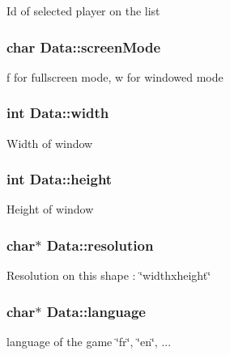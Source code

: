 Id of selected player on the list 
\subsubsection{\setlength{\rightskip}{0pt plus 5cm}char {\bf Data::screenMode}\hspace{0.3cm}{\tt  [protected]}}\label{classData_3ec26a33251799b0ef2d5761701f6bc2}


f for fullscreen mode, w for windowed mode 
\subsubsection{\setlength{\rightskip}{0pt plus 5cm}int {\bf Data::width}\hspace{0.3cm}{\tt  [protected]}}\label{classData_af3b89fcc4f2e12a58949b2658e24708}


Width of window 
\subsubsection{\setlength{\rightskip}{0pt plus 5cm}int {\bf Data::height}\hspace{0.3cm}{\tt  [protected]}}\label{classData_15b7471f8a89645cd371ac2b4ec639d2}


Height of window 
\subsubsection{\setlength{\rightskip}{0pt plus 5cm}char$\ast$ {\bf Data::resolution}\hspace{0.3cm}{\tt  [protected]}}\label{classData_3f1eedb27daa3de5cef9ec122e45b4bd}


Resolution on this shape : \char`\"{}widthxheight\char`\"{} 
\subsubsection{\setlength{\rightskip}{0pt plus 5cm}char$\ast$ {\bf Data::language}\hspace{0.3cm}{\tt  [protected]}}\label{classData_d887f480e9b65529a8cf5e758e2629ed}


language of the game \char`\"{}fr\char`\"{}, \char`\"{}en\char`\"{}, ... 
